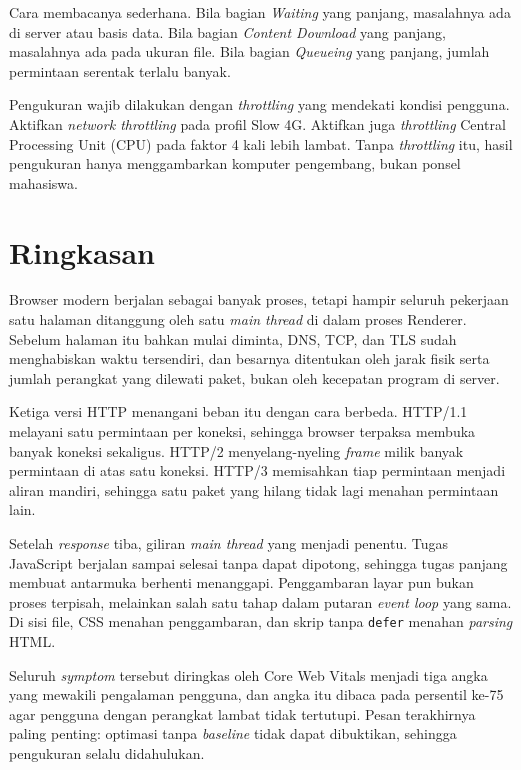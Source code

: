 Cara membacanya sederhana. Bila bagian \emph{Waiting} yang panjang, masalahnya
ada di server atau basis data. Bila bagian \emph{Content Download} yang
panjang, masalahnya ada pada ukuran file. Bila bagian \emph{Queueing} yang
panjang, jumlah permintaan serentak terlalu banyak.

Pengukuran wajib dilakukan dengan \textit{throttling} yang mendekati kondisi pengguna.
Aktifkan \textit{network throttling} pada profil Slow 4G. Aktifkan juga \textit{throttling} Central Processing Unit (CPU) pada faktor
4 kali lebih lambat. Tanpa \textit{throttling} itu,
hasil pengukuran hanya menggambarkan komputer pengembang, bukan ponsel
mahasiswa.

\section{Ringkasan}

Browser modern berjalan sebagai banyak proses, tetapi hampir seluruh pekerjaan
satu halaman ditanggung oleh satu \textit{main thread} di dalam proses
Renderer. Sebelum halaman itu bahkan mulai diminta, DNS, TCP, dan TLS sudah
menghabiskan waktu tersendiri, dan besarnya ditentukan oleh jarak fisik serta
jumlah perangkat yang dilewati paket, bukan oleh kecepatan program di server.

Ketiga versi HTTP menangani beban itu dengan cara berbeda. HTTP/1.1 melayani
satu permintaan per koneksi, sehingga browser terpaksa membuka banyak koneksi
sekaligus. HTTP/2 menyelang-nyeling \textit{frame} milik banyak permintaan di
atas satu koneksi. HTTP/3 memisahkan tiap permintaan menjadi aliran mandiri,
sehingga satu paket yang hilang tidak lagi menahan permintaan lain.

Setelah \textit{response} tiba, giliran \textit{main thread} yang menjadi penentu. Tugas
JavaScript berjalan sampai selesai tanpa dapat dipotong, sehingga tugas panjang
membuat antarmuka berhenti menanggapi. Penggambaran layar pun bukan proses
terpisah, melainkan salah satu tahap dalam putaran \textit{event loop} yang
sama. Di sisi file, CSS menahan penggambaran, dan skrip tanpa \texttt{defer}
menahan \textit{parsing} HTML.

Seluruh \textit{symptom} tersebut diringkas oleh Core Web Vitals menjadi tiga angka yang
mewakili pengalaman pengguna, dan angka itu dibaca pada persentil ke-75 agar
pengguna dengan perangkat lambat tidak tertutupi. Pesan terakhirnya paling
penting: optimasi tanpa \textit{baseline} tidak dapat dibuktikan, sehingga
pengukuran selalu didahulukan.
